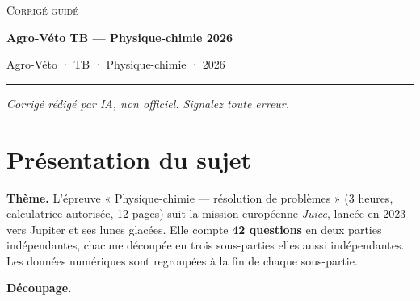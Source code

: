 \documentclass[11pt,a4paper]{article}
\begin{document}
\thispagestyle{plain}
\begin{center}
  {\small\scshape Corrigé guidé}\par\smallskip
  {\LARGE\bfseries Agro-Véto TB — Physique-chimie 2026\par}\medskip
  {\large Agro-Véto · TB · Physique-chimie · 2026\par}
\end{center}
\vspace{2pt}\hrule\vspace{8pt}

\emph{Corrigé rédigé par IA, non officiel. Signalez toute erreur.}

\hypertarget{pruxe9sentation-du-sujet}{%
\section{Présentation du sujet}\label{pruxe9sentation-du-sujet}}

\textbf{Thème.} L'épreuve « Physique-chimie --- résolution de problèmes » (3 heures, calculatrice autorisée, 12 pages) suit la mission européenne \emph{Juice}, lancée en 2023 vers Jupiter et ses lunes glacées. Elle compte \textbf{42 questions} en deux parties indépendantes, chacune découpée en trois sous-parties elles aussi indépendantes. Les données numériques sont regroupées à la fin de chaque sous-partie.

\textbf{Découpage.}
\end{document}
